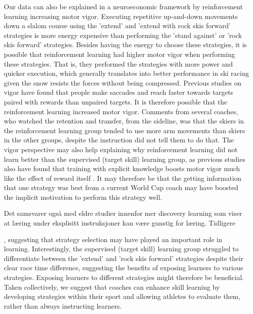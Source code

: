 \documentclass{article}
\begin{document}
Our data can also be explained in a neuroeconomic framework \cite{pietro_mazzoni_why_2007, dudman_basal_2016}  by reinforcement learning increasing motor vigor. Executing repetitive up-and-down movements down a slalom course using the 'extend' and 'extend with rock skis forward' strategies is more energy expensive than performing the 'stand against' or 'rock skis forward' strategies. Besides having the energy to choose these strategies, it is possible that reinforcement learning had higher motor vigor when performing these strategies. That is, they performed the strategies with more power and quicker execution, which generally translates into better performance in ski racing given the snow resists the forces without being compressed. Previous studies on vigor have found that people make saccades \cite{takikawa_modulation_2002} and reach\cite{summerside_vigor_2018} faster towards targets paired with rewards than unpaired targets. It is therefore possible that the reinforcement learning increased motor vigor. Comments from several coaches, who watched the retention and transfer, from the sideline, was that the skiers in the reinforcement learning group tended to use more arm movements than skiers in the other groups, despite the instruction did not tell them to do that. The vigor perspective may also help explaining why reinforcement learning did not learn better than the supervised (target skill) learning group, as previous studies also have found that training with explicit knowledge boosts motor vigor much like the effect of reward itself \cite{anderson_rewards_2020, wong_explicit_2015}. It may therefore be that the getting information that one strategy was best from a current World Cup coach may have boosted the implicit motivation to perform this strategy well. 






Det samsvarer også med eldre studier innenfor mer discovery learning som viser at læring under eksplisitt instruksjoner kan være gunstig for læring. Tidligere 




, suggesting that strategy selection may have played an important role in learning. Interestingly, the supervised (target skill) learning group struggled to differentiate between the 'extend' and 'rock skis forward' strategies despite their clear race time difference, suggesting the benefits of exposing learners to various strategies. Exposing learners to different strategies might therefore be beneficial. Taken collectively, we suggest that coaches can enhance skill learning by developing strategies within their sport and allowing athletes to evaluate them, rather than always instructing learners.
\end{document}
